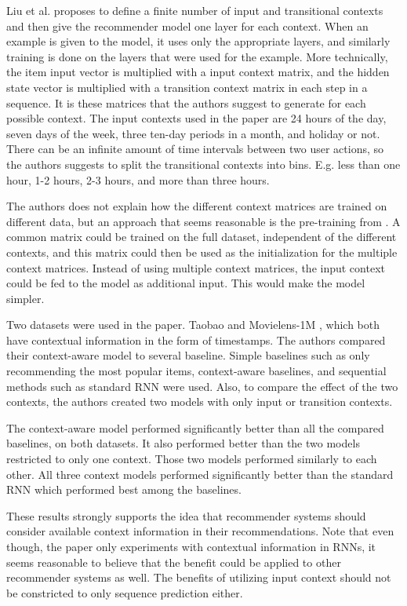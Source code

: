 Liu et al. proposes to define a finite number of input and transitional contexts and then give the recommender model one layer for each context. When an example is given to the model, it uses only the appropriate layers, and similarly training is done on the layers that were used for the example. More technically, the item input vector is multiplied with a input context matrix, and the hidden state vector is multiplied with a transition context matrix in each step in a sequence. It is these matrices that the authors suggest to generate for each possible context. The input contexts used in the paper are 24 hours of the day, seven days of the week, three ten-day periods in a month, and holiday or not. There can be an infinite amount of time intervals between two user actions, so the authors suggests to split the transitional contexts into bins. E.g. less than one hour, 1-2 hours, 2-3 hours, and more than three hours.

The authors does not explain how the different context matrices are trained on different data, but an approach that seems reasonable is the pre-training from \cite{DBLP:journals/corr/TanXL16}. A common matrix could be trained on the full dataset, independent of the different contexts, and this matrix could then be used as the initialization for the multiple context matrices. Instead of using multiple context matrices, the input context could be fed to the model as additional input. This would make the model simpler.

Two datasets were used in the paper. Taobao \cite{dataset:taobao} and Movielens-1M \cite{dataset:movielens}, which both have contextual information in the form of timestamps. The authors compared their context-aware model to several baseline. Simple baselines such as only recommending the most popular items, context-aware baselines, and sequential methods such as standard RNN were used. Also, to compare the effect of the two contexts, the authors created two models with only input or transition contexts.

The context-aware model performed significantly better than all the compared baselines, on both datasets. It also performed better than the two models restricted to only one context. Those two models performed similarly to each other. All three context models performed significantly better than the standard RNN which performed best among the baselines.

These results strongly supports the idea that recommender systems should consider available context information in their recommendations. Note that even though, the paper only experiments with contextual information in RNNs, it seems reasonable to believe that the benefit could be applied to other recommender systems as well. The benefits of utilizing input context should not be constricted to only sequence prediction either.


